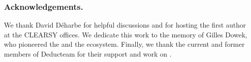 \subsubsection*{Acknowledgements.}
We thank David D\'eharbe for helpful discussions and for hosting the
first author at the CLEARSY offices.
%
We dedicate this work to the memory of Gilles Dowek,
who pioneered the \lpcmr{} and the \dedukti{} ecosystem.
%
Finally, we thank the current and former members of Deducteam
for their support and work on \lp{}.
